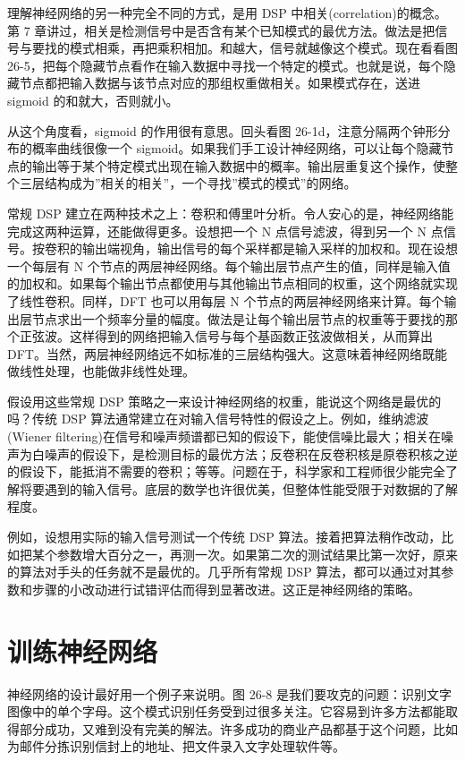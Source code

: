 理解神经网络的另一种完全不同的方式，是用 DSP
中相关(correlation)的概念。第 7
章讲过，相关是检测信号中是否含有某个已知模式的最优方法。做法是把信号与要找的模式相乘，再把乘积相加。和越大，信号就越像这个模式。现在看看图
26-5，把每个隐藏节点看作在输入数据中寻找一个特定的模式。也就是说，每个隐藏节点都把输入数据与该节点对应的那组权重做相关。如果模式存在，送进
sigmoid 的和就大，否则就小。

从这个角度看，sigmoid 的作用很有意思。回头看图
26-1d，注意分隔两个钟形分布的概率曲线很像一个
sigmoid。如果我们手工设计神经网络，可以让每个隐藏节点的输出等于某个特定模式出现在输入数据中的概率。输出层重复这个操作，使整个三层结构成为''相关的相关''，一个寻找''模式的模式''的网络。

常规 DSP
建立在两种技术之上：卷积和傅里叶分析。令人安心的是，神经网络能完成这两种运算，还能做得更多。设想把一个
N 点信号滤波，得到另一个 N
点信号。按卷积的输出端视角，输出信号的每个采样都是输入采样的加权和。现在设想一个每层有
N
个节点的两层神经网络。每个输出层节点产生的值，同样是输入值的加权和。如果每个输出节点都使用与其他输出节点相同的权重，这个网络就实现了线性卷积。同样，DFT
也可以用每层 N
个节点的两层神经网络来计算。每个输出层节点求出一个频率分量的幅度。做法是让每个输出层节点的权重等于要找的那个正弦波。这样得到的网络把输入信号与每个基函数正弦波做相关，从而算出
DFT。当然，两层神经网络远不如标准的三层结构强大。这意味着神经网络既能做线性处理，也能做非线性处理。

假设用这些常规 DSP
策略之一来设计神经网络的权重，能说这个网络是最优的吗？传统 DSP
算法通常建立在对输入信号特性的假设之上。例如，维纳滤波(Wiener
filtering)在信号和噪声频谱都已知的假设下，能使信噪比最大；相关在噪声为白噪声的假设下，是检测目标的最优方法；反卷积在反卷积核是原卷积核之逆的假设下，能抵消不需要的卷积；等等。问题在于，科学家和工程师很少能完全了解将要遇到的输入信号。底层的数学也许很优美，但整体性能受限于对数据的了解程度。

例如，设想用实际的输入信号测试一个传统 DSP
算法。接着把算法稍作改动，比如把某个参数增大百分之一，再测一次。如果第二次的测试结果比第一次好，原来的算法对手头的任务就不是最优的。几乎所有常规
DSP
算法，都可以通过对其参数和步骤的小改动进行试错评估而得到显著改进。这正是神经网络的策略。

\section{训练神经网络}

神经网络的设计最好用一个例子来说明。图 26-8
是我们要攻克的问题：识别文字图像中的单个字母。这个模式识别任务受到过很多关注。它容易到许多方法都能取得部分成功，又难到没有完美的解法。许多成功的商业产品都基于这个问题，比如为邮件分拣识别信封上的地址、把文件录入文字处理软件等。

